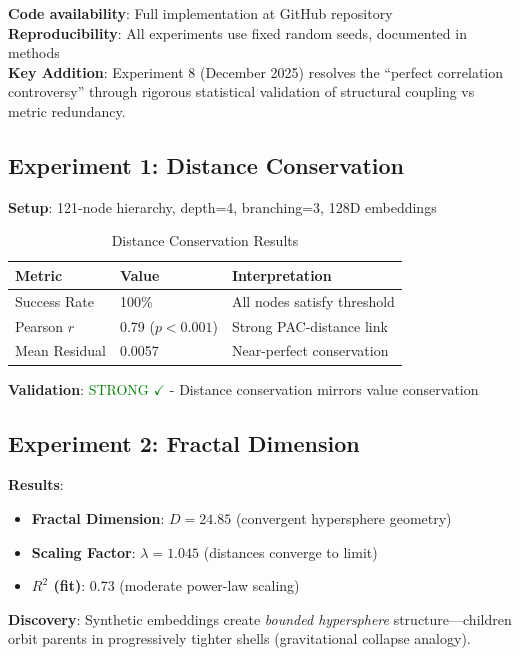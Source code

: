 \documentclass[11pt,a4paper]{article}
\begin{document}
\textbf{Code availability}: Full implementation at GitHub repository\\
\textbf{Reproducibility}: All experiments use fixed random seeds, documented in methods\\
\textbf{Key Addition}: Experiment 8 (December 2025) resolves the ``perfect correlation controversy'' through rigorous statistical validation of structural coupling vs metric redundancy.

\subsection{Experiment 1: Distance Conservation}

\textbf{Setup}: 121-node hierarchy, depth=4, branching=3, 128D embeddings

\begin{table}[h]
\centering
\begin{tabular}{lll}
\toprule
\textbf{Metric} & \textbf{Value} & \textbf{Interpretation} \\
\midrule
Success Rate & 100\% & All nodes satisfy threshold \\
Pearson $r$ & 0.79 ($p<0.001$) & Strong PAC-distance link \\
Mean Residual & 0.0057 & Near-perfect conservation \\
\bottomrule
\end{tabular}
\caption{Distance Conservation Results}
\end{table}

\textbf{Validation}: \textcolor{green}{STRONG $\checkmark$} - Distance conservation mirrors value conservation

\subsection{Experiment 2: Fractal Dimension}

\textbf{Results}:
\begin{itemize}
    \item \textbf{Fractal Dimension}: $D = 24.85$ (convergent hypersphere geometry)
    \item \textbf{Scaling Factor}: $\lambda = 1.045$ (distances converge to limit)
    \item \textbf{$R^2$ (fit)}: 0.73 (moderate power-law scaling)
\end{itemize}

\textbf{Discovery}: Synthetic embeddings create \emph{bounded hypersphere} structure---children orbit parents in progressively tighter shells (gravitational collapse analogy).
\end{document}
